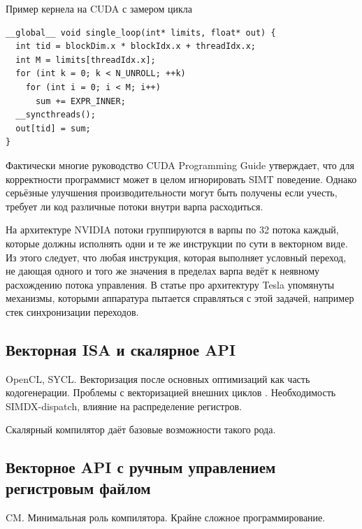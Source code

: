 \begin{ListingEnv}[!h]
    \captiondelim{ } 
    \caption{Пример кернела на CUDA с замером цикла}\label{lst:cudashader}
    \begin{lstlisting}[language={[ISO]C++}]
__global__ void single_loop(int* limits, float* out) {
  int tid = blockDim.x * blockIdx.x + threadIdx.x;
  int M = limits[threadIdx.x];
  for (int k = 0; k < N_UNROLL; ++k)
    for (int i = 0; i < M; i++)
      sum += EXPR_INNER;
  __syncthreads();
  out[tid] = sum;
}
    \end{lstlisting}
\end{ListingEnv}

Фактически многие руководство CUDA Programming Guide \cite{guide2013cuda} утверждает, что для корректности программист может в целом игнорировать SIMT поведение. Однако серьёзные улучшения производительности могут быть получены если учесть, требует ли код различные потоки внутри варпа расходиться.

На архитектуре NVIDIA потоки группируются в варпы по 32 потока каждый, которые должны исполнять одни и те же инструкции по сути в векторном виде. Из этого следует, что любая инструкция, которая выполняет условный переход, не дающая одного и того же значения в пределах варпа ведёт к неявному расхождению потока управления. В статье про архитектуру Tesla \cite{lindholm2008nvidia} упомянуты механизмы, которыми аппаратура пытается справляться с этой задачей, например стек синхронизации переходов.

\subsection{Векторная ISA и скалярное API}\label{subsec:overview/vectorizing/sycl}

OpenCL, SYCL. Векторизация после основных оптимизаций как часть кодогенерации. Проблемы с векторизацией внешних циклов \cite{vasudevan1982inner}. Необходимость SIMDX-dispatch, влияние на распределение регистров. \cite{ashbaugh2020data}
\cite{reinders2021sycl}

Скалярный компилятор \cite{weiss1987study} даёт базовые возможности такого рода.

\subsection{Векторное API с ручным управлением регистровым файлом}\label{subsec:overview/vectorizing/cm}

CM. Минимальная роль компилятора. Крайне сложное программирование.

